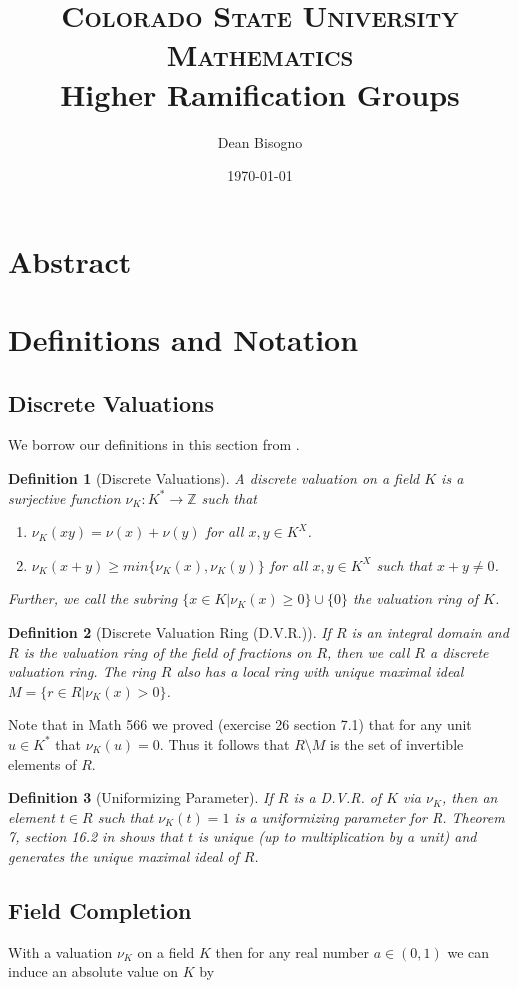 \documentclass[paper=a4, fontsize=11pt]{scrartcl} %
\title{	
\normalfont \normalsize 
\textsc{Colorado State University Mathematics} \\ [25pt] %
\huge Higher Ramification Groups \\ %
}
\author{Dean Bisogno} %
\date{\normalsize\today} %
\numberwithin{equation}{section} %
\numberwithin{figure}{section} %
\numberwithin{table}{section} %
\theoremstyle{break}
\newtheorem{defn}{Definition}
\begin{document}
\maketitle %
\section{Abstract}
\section{Definitions and Notation}
\subsection{Discrete Valuations}
We borrow our definitions in this section from \cite{DnF}. 
\begin{defn}[Discrete Valuations]
A discrete valuation on a field $K$ is a surjective function $\nu_K: K^* \to \mathbb{Z}$ such that
\begin{enumerate}
\item $\nu_K(xy) = \nu(x) + \nu(y)$ for all $x,y\in K^X$.
\item $\nu_K(x+y) \geq min\{\nu_K(x),\nu_K(y)\}$ for all $x,y\in K^X$ such that $x+y \not= 0$.
\end{enumerate}
Further, we call the subring $\{x \in K|\nu_K(x) \geq 0\} \cup \{0\}$ the valuation ring of $K$.
\end{defn}
\begin{defn}[Discrete Valuation Ring (D.V.R.)]
If $R$ is an integral domain and $R$ is the valuation ring of the field of fractions on $R$, then we call $R$ a discrete valuation ring. The ring $R$ also has a local ring with unique maximal ideal $M=\{r \in R | \nu_K(x) > 0\}$.
\end{defn}
Note that in Math 566 we proved (exercise 26 section 7.1) that for any unit $u \in K^*$ that $\nu_K(u)=0$. Thus it follows that $R \setminus M$ is the set of invertible elements of $R$.
\begin{defn}[Uniformizing Parameter]
If $R$ is a D.V.R. of $K$ via $\nu_K$, then an element $t\in R$ such that $\nu_K(t) = 1$ is a uniformizing parameter for R. Theorem 7, section 16.2 in \cite{DnF} shows that $t$ is unique (up to multiplication by a unit) and generates the unique maximal ideal of $R$.
\end{defn}

\subsection{Field Completion}
With a valuation $\nu_K$ on a field $K$ then for any real number $a\in(0,1)$ we can induce an absolute value on $K$ by
\end{document}
